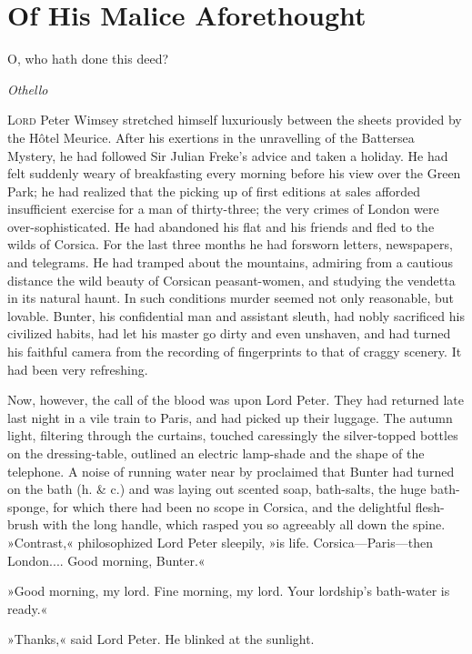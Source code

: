 


\chapter{Of His Malice Aforethought}

\epigraph{O, who hath done this deed?}{\textit{Othello}}


\lettrine[lines=4]{L}{ord} Peter Wimsey stretched himself luxuriously be\-tween the sheets provided by the Hôtel Meurice. After his exertions in the unravelling of the Battersea Mystery, he had followed Sir Julian Freke's advice and taken a holiday. He had felt suddenly weary of breakfasting every morning before his view over the Green Park; he had realized that the picking up of first editions at sales afforded insufficient exercise for a man of thirty-three; the very crimes of London were over-sophisticated. He had abandoned his flat and his friends and fled to the wilds of Corsica. For the last three months he had forsworn letters, newspapers, and telegrams. He had tramped about the mountains, admiring from a cautious distance the wild beauty of Corsican peasant-women, and studying the vendetta in its natural haunt. In such conditions murder seemed not only reasonable, but lovable. Bunter, his confidential man and assistant sleuth, had nobly sacrificed his civilized habits, had let his master go dirty and even unshaven, and had turned his faithful camera from the recording of fingerprints to that of craggy scenery. It had been very refreshing.

Now, however, the call of the blood was upon Lord Peter. They had returned late last night in a vile train to Paris, and had picked up their luggage. The autumn light, filtering through the curtains, touched caressingly the silver-topped bottles on the dressing-table, outlined an electric lamp-shade and the shape of the telephone. A noise of running water near by proclaimed that Bunter had turned on the bath (h. \& c.) and was laying out scented soap, bath-salts, the huge bath-sponge, for which there had been no scope in Corsica, and the delightful flesh-brush with the long handle, which rasped you so agreeably all down the spine. »Contrast,« philosophized Lord Peter sleepily, »is life. Corsica—Paris—then London.... Good morning, Bunter.«

»Good morning, my lord. Fine morning, my lord. Your lordship's bath-water is ready.«

»Thanks,« said Lord Peter. He blinked at the sunlight.


